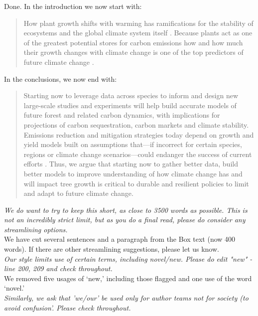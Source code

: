 \documentclass[11pt]{article}
\begin{document}
Done. In the introduction we now start with:

\begin{quote}
How plant growth shifts with warming has ramifications for the stability of ecosystems and the global climate system itself \citep{ipcc2021}. Because plants act as one of the greatest potential stores for carbon emissions how and how much their growth changes with climate change is one of the top predictors of future climate change \citep{ipcc2021,friedlingstein2022global}. 
\end{quote}

In the conclusions, we now end with: 

\begin{quote}
Starting now to leverage data across species to inform and design new large-scale studies and experiments will help build accurate models of future forest and related carbon dynamics, with implications for projections of carbon sequestration, carbon markets and climate stability. Emissions reduction and mitigation strategies today depend on growth and yield models built on assumptions that---if incorrect for certain species, regions or climate change scenarios---could endanger the success of current efforts \citep{ellis2024principles}. Thus, we argue that starting now to gather better data, build better models to improve understanding of how climate change has and will impact tree growth is critical to durable and resilient policies to limit and adapt to future climate change.
\end{quote}

\emph{We do want to try to keep this short, as close to 3500 words as possible. This is not an incredibly strict limit, but as you do a final read, please do consider any streamlining options.}\\

We have cut several sentences and a paragraph from the Box text (now 400 words). If there are other streamlining suggestions, please let us know.\\

\emph{Our style limits use of certain terms, including novel/new. Please do edit "new" - line 200, 209 and check throughout.}\\

We removed five usages of `new,' including those flagged and one use of the word `novel.'\\ 


\emph{Similarly, we ask that 'we/our' be used only for author teams not for society (to avoid confusion'. Please check throughout.}\\
\end{document}
